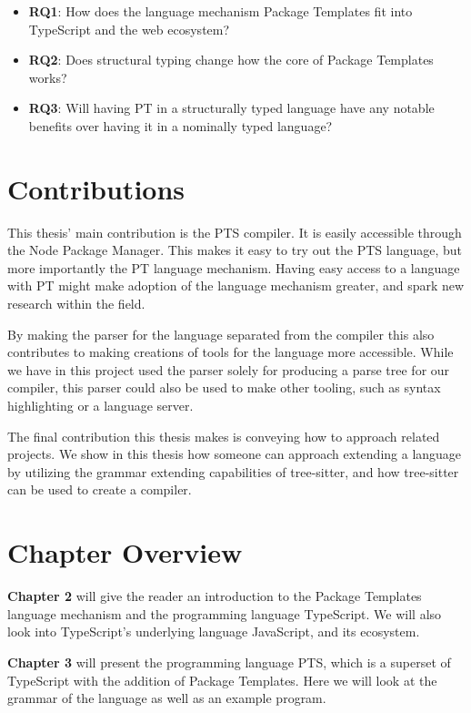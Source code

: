 \begin{itemize}
    \item \textbf{RQ1}: How does the language mechanism Package Templates fit into TypeScript and the web ecosystem?
    \item \textbf{RQ2}: Does structural typing change how the core of Package Templates works?
    \item \textbf{RQ3}: Will having PT in a structurally typed language have any notable benefits over having it in a nominally typed language?
\end{itemize}

\section{Contributions}\label{sec:contributions}

This thesis' main contribution is the PTS compiler.
It is easily accessible through the Node Package Manager.
This makes it easy to try out the PTS language, but more importantly the PT language mechanism.
Having easy access to a language with PT might make adoption of the language mechanism greater, and spark new research within the field.

By making the parser for the language separated from the compiler this also contributes to making creations of tools for the language more accessible.
While we have in this project used the parser solely for producing a parse tree for our compiler, this parser could also be used to make other tooling, such as syntax highlighting or a language server.

The final contribution this thesis makes is conveying how to approach related projects.
We show in this thesis how someone can approach extending a language by utilizing the grammar extending capabilities of tree-sitter, and how tree-sitter can be used to create a compiler.

\section{Chapter Overview}\label{sec:chapter-overview}


\textbf{Chapter 2} will give the reader an introduction to the Package Templates language mechanism and the programming language TypeScript.
We will also look into TypeScript's underlying language JavaScript, and its ecosystem.

\textbf{Chapter 3} will present the programming language PTS, which is a superset of TypeScript with the addition of Package Templates.
Here we will look at the grammar of the language as well as an example program.

